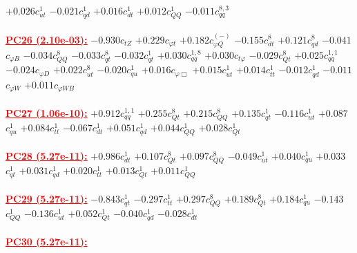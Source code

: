 \documentclass{article}
\begin{document}
{$+0.026$}{\rm $c_{ut}^{1}$} 
{$-0.021$}{\rm $c_{qd}^{1}$} 
{$+0.016$}{\rm $c_{dt}^{1}$} 
{$+0.012$}{\rm $c_{QQ}^{1}$} 
{$-0.011$}{\rm $c_{qq}^{8,3}$} 
 \nonumber \\ \nonumber \\ 
\noindent \textcolor{red}{\underline{\bf{PC26} (2.10e-03):}}
{$-0.930$}{\rm $c_{tZ}$} 
{$+0.229$}{\rm $c_{\varphi t}$} 
{$+0.182$}{\rm $c_{\varphi Q}^{(-)}$} 
{$-0.155$}{\rm $c_{dt}^{8}$} 
{$+0.121$}{\rm $c_{qd}^{8}$} 
{$-0.041$}{\rm $c_{\varphi B}$} 
{$-0.034$}{\rm $c_{QQ}^{8}$} 
{$-0.033$}{\rm $c_{qt}^{8}$} 
{$-0.032$}{\rm $c_{qt}^{1}$} 
{$+0.030$}{\rm $c_{qq}^{1,8}$} 
{$+0.030$}{\rm $c_{t \varphi}$} 
{$-0.029$}{\rm $c_{Qt}^{8}$} 
{$+0.025$}{\rm $c_{qq}^{1,1}$} 
{$-0.024$}{\rm $c_{\varphi D}$} 
{$+0.022$}{\rm $c_{ut}^{8}$} 
{$-0.020$}{\rm $c_{qu}^{1}$} 
{$+0.016$}{\rm $c_{\varphi \Box}$} 
{$+0.015$}{\rm $c_{ut}^{1}$} 
{$+0.014$}{\rm $c_{tt}^{1}$} 
{$-0.012$}{\rm $c_{qd}^{1}$} 
{$-0.011$}{\rm $c_{\varphi W}$} 
{$+0.011$}{\rm $c_{\varphi WB}$} 
 \nonumber \\ \nonumber \\ 
\noindent \textcolor{red}{\underline{\bf{PC27} (1.06e-10):}}
{$+0.912$}{\rm $c_{qq}^{1,1}$} 
{$+0.255$}{\rm $c_{Qt}^{8}$} 
{$+0.215$}{\rm $c_{QQ}^{8}$} 
{$+0.135$}{\rm $c_{qt}^{1}$} 
{$-0.116$}{\rm $c_{ut}^{1}$} 
{$+0.087$}{\rm $c_{qu}^{1}$} 
{$+0.084$}{\rm $c_{tt}^{1}$} 
{$-0.067$}{\rm $c_{dt}^{1}$} 
{$+0.051$}{\rm $c_{qd}^{1}$} 
{$+0.044$}{\rm $c_{QQ}^{1}$} 
{$+0.028$}{\rm $c_{Qt}^{1}$} 
 \nonumber \\ \nonumber \\ 
\noindent \textcolor{red}{\underline{\bf{PC28} (5.27e-11):}}
{$+0.986$}{\rm $c_{dt}^{1}$} 
{$+0.107$}{\rm $c_{Qt}^{8}$} 
{$+0.097$}{\rm $c_{QQ}^{8}$} 
{$-0.049$}{\rm $c_{ut}^{1}$} 
{$+0.040$}{\rm $c_{qu}^{1}$} 
{$+0.033$}{\rm $c_{qt}^{1}$} 
{$+0.031$}{\rm $c_{qd}^{1}$} 
{$+0.020$}{\rm $c_{tt}^{1}$} 
{$+0.013$}{\rm $c_{Qt}^{1}$} 
{$+0.011$}{\rm $c_{QQ}^{1}$} 
 \nonumber \\ \nonumber \\ 
\noindent \textcolor{red}{\underline{\bf{PC29} (5.27e-11):}}
{$-0.843$}{\rm $c_{qt}^{1}$} 
{$-0.297$}{\rm $c_{tt}^{1}$} 
{$+0.297$}{\rm $c_{QQ}^{8}$} 
{$+0.189$}{\rm $c_{Qt}^{8}$} 
{$+0.184$}{\rm $c_{qu}^{1}$} 
{$-0.143$}{\rm $c_{QQ}^{1}$} 
{$-0.136$}{\rm $c_{ut}^{1}$} 
{$+0.052$}{\rm $c_{Qt}^{1}$} 
{$-0.040$}{\rm $c_{qd}^{1}$} 
{$-0.028$}{\rm $c_{dt}^{1}$} 
 \nonumber \\ \nonumber \\ 
\noindent \textcolor{red}{\underline{\bf{PC30} (5.27e-11):}}
\end{document}
